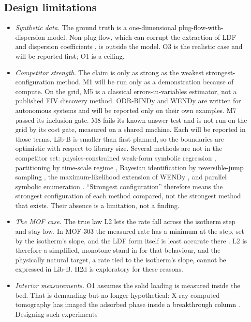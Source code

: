 \documentclass[11pt]{article}
\begin{document}
\subsection{Design limitations}
\label{sec:limits}
\begin{itemize}
\item \emph{Synthetic data.} The ground truth is a one-dimensional plug-flow-with-dispersion
model. Non-plug flow, which can corrupt the extraction of LDF and dispersion coefficients
\citep{knox2016}, is outside the model. O3 is the realistic case and will be reported
first; O1 is a ceiling.
\item \emph{Competitor strength.} The claim is only as strong as the weakest
strongest-configuration method. M1 will be run only as a demonstration because of compute.
On the grid, M5 is a classical errors-in-variables estimator, not a published EIV
discovery method. ODR-BINDy and WENDy are written for autonomous systems and will be
reported only on their own examples. M7 passed its inclusion gate. M8 fails its
known-answer test and is not run on the grid by its cost gate, measured on a shared
machine. Each will be reported in those terms. Lib-B is smaller than first planned, so the
boundaries are optimistic with respect to library size. Several methods are not in the
competitor set: physics-constrained weak-form symbolic regression
\citep{servia2024,servia2025}, partitioning by time-scale regime \citep{muhammed2025},
Bayesian identification by reversible-jump sampling \citep{champneys2025}, the
maximum-likelihood extension of WENDy \citep{rummel2025}, and parallel symbolic enumeration
\citep{ruan2025}. ``Strongest configuration'' therefore means the strongest configuration of
each method compared, not the strongest method that exists. Their absence is a limitation,
not a finding.
\item \emph{The MOF case.} The true law L2 lets the rate fall across the isotherm step and
stay low. In MOF-303 the measured rate has a minimum at the step, set by the isotherm's slope,
and the LDF form itself is least accurate there \citep{lassitter2024,hastings2024}. L2 is
therefore a simplified, monotone stand-in for that behaviour, and the physically natural
target, a rate tied to the isotherm's slope, cannot be expressed in Lib-B. H2d is
exploratory for these reasons.
\item \emph{Interior measurements.} O1 assumes the solid loading is measured inside the bed.
That is demanding but no longer hypothetical: X-ray computed tomography has imaged the
adsorbed phase inside a breakthrough column \citep{buchner2026}. Designing such experiments

\end{itemize}
\end{document}
